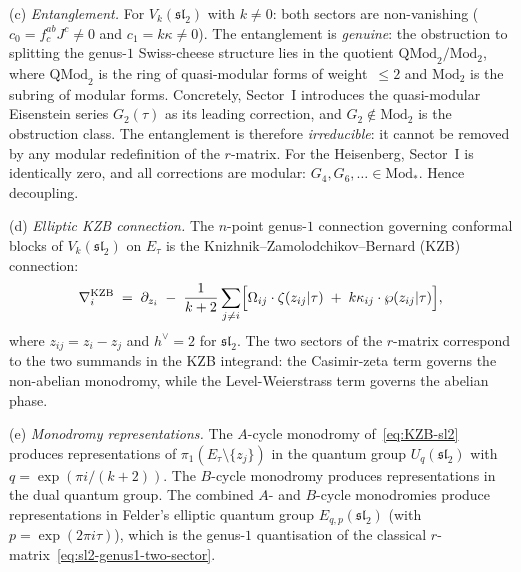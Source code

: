 \begin{theorem}
\medskip
\noindent\textup{(c)} \emph{Entanglement.}
For $V_k(\mathfrak{sl}_2)$ with $k \ne 0$: both sectors are
non-vanishing ($c_0 = f^{ab}_c J^c \ne 0$ and
$c_1 = k\kappa \ne 0$). The entanglement is \emph{genuine}:
the obstruction to splitting the genus-$1$ Swiss-cheese
structure lies in the quotient
$\mathrm{QMod}_2 / \mathrm{Mod}_2$, where
$\mathrm{QMod}_2$ is the ring of quasi-modular forms of
weight~$\le 2$ and $\mathrm{Mod}_2$ is the subring of
modular forms. Concretely, Sector~I introduces the
quasi-modular Eisenstein series $G_2(\tau)$ as its leading
correction, and $G_2 \notin \mathrm{Mod}_2$ is the
obstruction class. The entanglement is therefore
\emph{irreducible}: it cannot be removed by any modular
redefinition of the $r$-matrix.
For the Heisenberg, Sector~I is identically zero, and
all corrections are modular: $G_4, G_6, \ldots \in
\mathrm{Mod}_\ast$. Hence decoupling.

\medskip
\noindent\textup{(d)} \emph{Elliptic KZB connection.}
The $n$-point genus-$1$ connection governing
conformal blocks of $V_k(\mathfrak{sl}_2)$ on $E_\tau$ is
the Knizhnik--Zamolodchikov--Bernard \textup{(}KZB\textup{)}
connection:
\begin{equation}\label{eq:KZB-sl2}
 \nabla_i^{\mathrm{KZB}}
 \;=\;
 \partial_{z_i}
 \;-\;
 \frac{1}{k + 2}
 \sum_{j \ne i}
 \Bigl[
 \Omega_{ij} \cdot \zeta(z_{ij}|\tau)
 \;+\;
 k\kappa_{ij} \cdot \wp(z_{ij}|\tau)
 \Bigr],
\end{equation}
where $z_{ij} = z_i - z_j$ and $h^\vee = 2$ for
$\mathfrak{sl}_2$. The two sectors of the $r$-matrix
correspond to the two summands in the KZB integrand: the
Casimir-zeta term governs the non-abelian monodromy, while
the Level-Weierstrass term governs the abelian phase.

\medskip
\noindent\textup{(e)} \emph{Monodromy representations.}
The $A$-cycle monodromy of~\eqref{eq:KZB-sl2} produces
representations of $\pi_1(E_\tau \setminus \{z_j\})$ in
the quantum group $U_q(\mathfrak{sl}_2)$ with
$q = \exp(\pi i/(k+2))$. The $B$-cycle monodromy produces
representations in the dual quantum group.
The combined $A$- and $B$-cycle monodromies produce
representations in Felder's elliptic quantum group
$E_{q,p}(\mathfrak{sl}_2)$
\textup{(}with $p = \exp(2\pi i\tau)$\textup{)},
which is the genus-$1$ quantisation of the classical
$r$-matrix~\eqref{eq:sl2-genus1-two-sector}.
\end{theorem}


